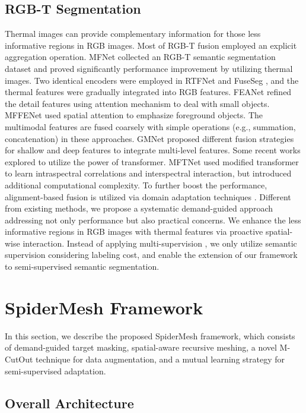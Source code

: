 \documentclass[letterpaper, 10 pt, conference]{ieeeconf}
\begin{document}
\subsection{RGB-T Segmentation}
Thermal images can provide complementary information for those less informative regions in RGB images. Most of RGB-T fusion employed an explicit aggregation operation\cite{mitigating, 10103760, li2022rgb, 9987529, zhou2022mtanet, Zhang_2023_CVPR}. MFNet \cite{mfnet} collected an RGB-T semantic segmentation dataset and proved significantly performance improvement by utilizing thermal images. Two identical encoders were employed in RTFNet \cite{rtfnet} and FuseSeg \cite{fuseseg}, and the thermal features were gradually integrated into RGB features. FEANet \cite{feanet} refined the detail features using attention mechanism to deal with small objects. MFFENet \cite{mffenet} used spatial attention to emphasize foreground objects. The multimodal features are fused coarsely with simple operations (e.g., summation, concatenation) in these approaches. GMNet \cite{gmnet} proposed different fusion strategies for shallow and deep features to integrate multi-level features. Some recent works explored to utilize the power of transformer. MFTNet \cite{MFTNet} used modified transformer to learn intraspectral correlations and interspectral interaction, but introduced additional computational complexity. To further boost the performance, alignment-based fusion is utilized via domain adaptation techniques \cite{ABMDRNet, msuda}. Different from existing methods, we propose a systematic demand-guided approach addressing not only performance but also practical concerns. We enhance the less informative regions in RGB images with thermal features via proactive spatial-wise interaction. Instead of applying multi-supervision \cite{gmnet, mffenet}, we only utilize semantic supervision considering labeling cost, and enable the extension of our framework to semi-supervised semantic segmentation.

\section{SpiderMesh Framework }

In this section, we describe the proposed SpiderMesh framework, which consists of demand-guided target masking, spatial-aware recursive meshing, a novel M-CutOut technique for data augmentation, and a mutual learning strategy for semi-supervised adaptation.

\subsection{Overall Architecture}
\end{document}
